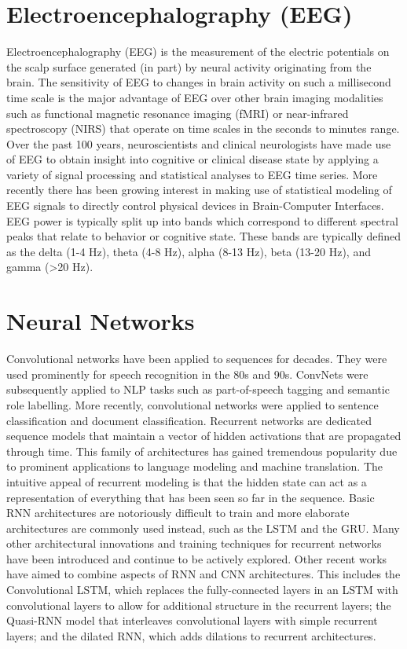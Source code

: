 \documentclass[12pt,a4paper,titlepage,openany]{report}
\begin{document}
\section{Electroencephalography (EEG)}

Electroencephalography (EEG) is the measurement of the electric potentials on the scalp surface generated (in part) by neural activity originating from the brain. 
The sensitivity of EEG to changes in brain activity on such a millisecond time scale is the major advantage of EEG over other brain imaging modalities such as functional magnetic resonance imaging (fMRI) or near-infrared spectroscopy (NIRS) that operate on time scales in the seconds to minutes range. 
Over the past 100 years, neuroscientists and clinical neurologists have made use of EEG to obtain insight into cognitive or clinical disease state by applying a variety of signal processing and statistical analyses to EEG time series. 
More recently there has been growing interest in making use of statistical modeling of EEG signals to directly control physical devices in Brain-Computer Interfaces.
EEG power is typically split up into bands which correspond to different spectral peaks that relate to behavior or cognitive state. These bands are typically defined as the delta (1-4 Hz), theta (4-8 Hz), alpha (8-13 Hz), beta (13-20 Hz), and gamma (\textgreater 20 Hz).\cite{nunez2016}

\section{Neural Networks}

Convolutional networks have been applied to sequences for decades. They were used prominently for speech recognition in the 80s and 90s. 
ConvNets were subsequently applied to NLP tasks such as part-of-speech tagging and semantic role labelling. 
More recently, convolutional networks were applied to sentence classification and document classification. 
Recurrent networks are dedicated sequence models that maintain a vector of hidden activations that are propagated through time. 
This family of architectures has gained tremendous popularity due to prominent applications to language modeling and machine translation. 
The intuitive appeal of recurrent modeling is that the hidden state can act as a representation of everything that has been seen so far in the sequence. 
Basic RNN architectures are notoriously difficult to train and more elaborate architectures are commonly used instead, such as the LSTM and the GRU. 
Many other architectural innovations and training techniques for recurrent networks have been introduced and continue to be actively explored.
Other recent works have aimed to combine aspects of RNN and CNN architectures. This includes the Convolutional LSTM, which replaces the fully-connected layers in an LSTM with convolutional layers to allow for additional structure in the recurrent layers; the Quasi-RNN model that interleaves convolutional layers with simple recurrent layers; and the dilated RNN, which adds dilations to recurrent architectures.\\
\end{document}
